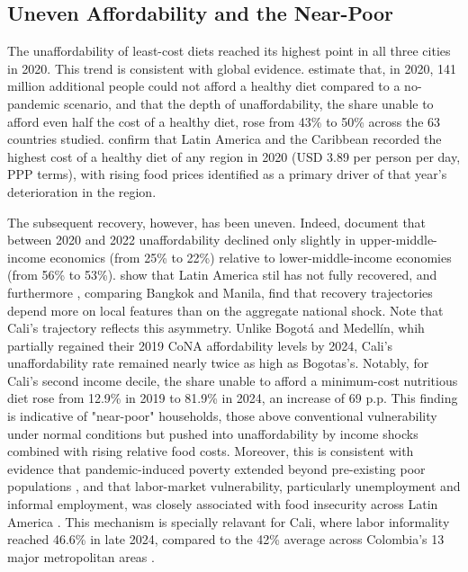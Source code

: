 \documentclass[Afour, sageh,times]{sagej}
\begin{document}
\subsection{Uneven Affordability and the Near-Poor}

The unaffordability of least-cost diets reached its highest point in all three cities in 2020. This trend is consistent with global evidence. \citealt{Laborde2021} estimate that, in 2020, 141 million additional people could not afford a healthy diet compared to a no-pandemic scenario, and that the depth of unaffordability, the share unable to afford even half the cost of a healthy diet, rose from 43\% to 50\% across the 63 countries studied. \citet{FAO2022SOFI} confirm that Latin America and the Caribbean recorded the highest cost of a healthy diet of any region in 2020 (USD 3.89 per person per day, PPP terms), with rising food prices identified as a primary driver of that year's deterioration in the region.

\smallskip

The subsequent recovery, however, has been uneven. Indeed, \citealt{RoseroMoncayo2024} document that between 2020 and 2022 unaffordability declined only slightly in upper-middle-income economics (from 25\% to 22\%) relative to lower-middle-income economies (from 56\% to 53\%). \citealt{FAO2025} show that Latin America stil has not fully recovered, and furthermore \citealt{Mwambi2023}, comparing Bangkok and Manila, find that recovery trajectories depend more on local features than on the aggregate national shock. Note that Cali's trajectory reflects this asymmetry. Unlike Bogotá and Medellín, whih partially regained their 2019 CoNA affordability levels by 2024, Cali's unaffordability rate remained nearly twice as high as Bogotas's. Notably, for Cali's second income decile, the share unable to afford a minimum-cost nutritious diet rose from 12.9\% in 2019 to 81.9\% in 2024, an increase of 69 p.p. This finding is indicative of "near-poor" households, those above conventional vulnerability under normal conditions but pushed into unaffordability by income shocks combined with rising relative food costs. Moreover, this is consistent with evidence that pandemic-induced poverty extended beyond pre-existing poor populations \citep{Lustig2023}, and that labor-market vulnerability, particularly unemployment and informal employment, was closely associated with food insecurity across Latin America \citep{NovoaSanzana2024}. This mechanism is specially relavant for Cali, where labor informality reached 46.6\% in late 2024, compared to the 42\% average across Colombia's 13 major metropolitan areas \citep{DANE2025}.
\end{document}

